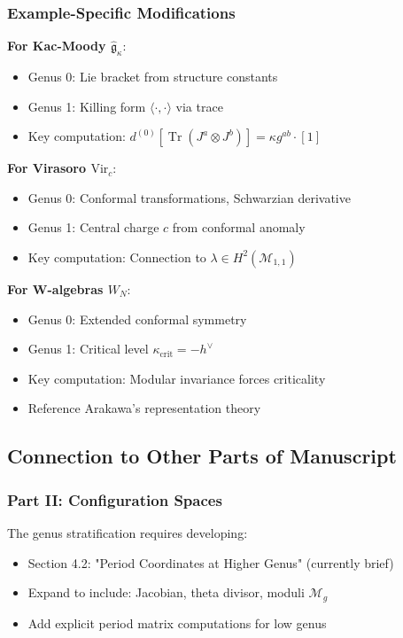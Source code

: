 \subsubsection{Example-Specific Modifications}

\textbf{For Kac-Moody $\hat{\mathfrak{g}}_\kappa$}:
\begin{itemize}
\item Genus 0: Lie bracket from structure constants
\item Genus 1: Killing form $\langle \cdot, \cdot \rangle$ via trace
\item Key computation: $d^{(0)}[\operatorname{Tr}(J^a \otimes J^b)] = \kappa g^{ab} \cdot [1]$
\end{itemize}

\textbf{For Virasoro $\text{Vir}_c$}:
\begin{itemize}
\item Genus 0: Conformal transformations, Schwarzian derivative
\item Genus 1: Central charge $c$ from conformal anomaly
\item Key computation: Connection to $\lambda \in H^2(\mathcal{M}_{1,1})$
\end{itemize}

\textbf{For W-algebras $W_N$}:
\begin{itemize}
\item Genus 0: Extended conformal symmetry
\item Genus 1: Critical level $\kappa_{\text{crit}} = -h^\vee$
\item Key computation: Modular invariance forces criticality
\item Reference Arakawa's representation theory
\end{itemize}

\subsection{Connection to Other Parts of Manuscript}

\subsubsection{Part II: Configuration Spaces}

The genus stratification requires developing:
\begin{itemize}
\item Section 4.2: "Period Coordinates at Higher Genus" (currently brief)
\item Expand to include: Jacobian, theta divisor, moduli $\mathcal{M}_g$
\item Add explicit period matrix computations for low genus
\end{itemize}

